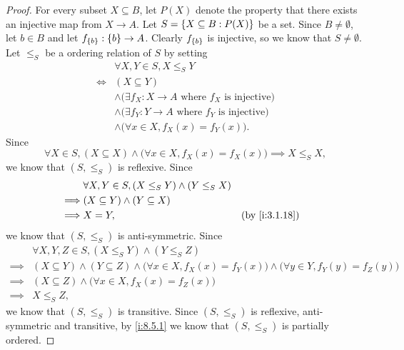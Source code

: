 \begin{proof}
  For every subset \(X \subseteq B\), let \(P(X)\) denote the property that there exists an injective map from \(X \to A\).
  Let \(S = \left\lbrace X \subseteq B : P(X)\right\rbrace\) be a set.
  Since \(B \neq \emptyset\), let \(b \in B\) and let \(f_{\left\lbrace b\right\rbrace} : \left\lbrace b\right\rbrace \to A\).
  Clearly \(f_{\left\lbrace b\right\rbrace}\) is injective, so we know that \(S \neq \emptyset\).
  Let \(\leq_S\) be a ordering relation of \(S\) by setting
  \begin{align*}
         & \forall X, Y \in S, X \leq_S Y                                           \\
    \iff & (X \subseteq Y)                                                          \\
         & \land \big(\exists f_X : X \to A \text{ where \(f_X\) is injective}\big) \\
         & \land \big(\exists f_Y : Y \to A \text{ where \(f_Y\) is injective}\big) \\
         & \land \big(\forall x \in X, f_X(x) = f_Y(x)\big).
  \end{align*}
  Since
  \[
    \forall X \in S, (X \subseteq X) \land \big(\forall x \in X, f_X(x) = f_X(x)\big) \implies X \leq_S X,
  \]
  we know that \((S, \leq_S)\) is reflexive.
  Since
  \begin{align*}
             & \forall X, Y \in S, (X \leq_S Y) \land (Y \leq_S X)                    \\
    \implies & (X \subseteq Y) \land (Y \subseteq X)                                  \\
    \implies & X = Y,                                              &  & \by{i:3.1.18}
  \end{align*}
  we know that \((S, \leq_S)\) is anti-symmetric.
  Since
  \begin{align*}
             & \forall X, Y, Z \in S, (X \leq_S Y) \land (Y \leq_S Z)                                                                                  \\
    \implies & (X \subseteq Y) \land (Y \subseteq Z) \land \big(\forall x \in X, f_X(x) = f_Y(x)\big) \land \big(\forall y \in Y, f_Y(y) = f_Z(y)\big) \\
    \implies & (X \subseteq Z) \land \big(\forall x \in X, f_X(x) = f_Z(x)\big)                                                                        \\
    \implies & X \leq_S Z,
  \end{align*}
  we know that \((S, \leq_S)\) is transitive.
  Since \((S, \leq_S)\) is reflexive, anti-symmetric and transitive, by \cref{i:8.5.1} we know that \((S, \leq_S)\) is partially ordered.


\end{proof}
